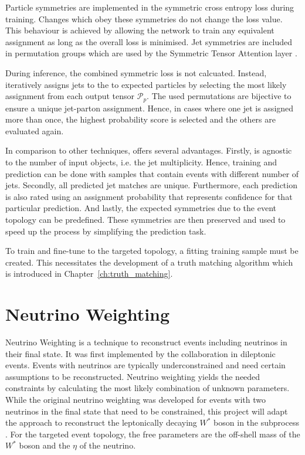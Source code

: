 \documentclass[bachelor,ngerman,english]{GAUBM}
\begin{document}
Particle symmetries are implemented in the symmetric cross entropy loss during training. Changes which obey these symmetries do not change the loss value. This behaviour is achieved by allowing the network to train any equivalent assignment as long as the overall loss is minimised. Jet symmetries are included in permutation groups which are used by the Symmetric Tensor Attention layer \cite{spanet_01}.

During inference, the combined symmetric loss is not calcuated. Instead, \spanet iteratively assigns jets to the to expected particles by selecting the most likely assignment from each output tensor $\mathcal{P}_p$. The used permutations are bijective to ensure a unique jet-parton assignment. Hence, in cases where one jet is assigned more than once, the highest probability score is selected and the others are evaluated again.

In comparison to other techniques, \spanet offers several advantages. Firstly, \spanet is agnostic to the number of input objects, i.e. the jet multiplicity. Hence, training and prediction can be done with samples that contain events with different number of jets. Secondly, all predicted jet matches are unique. Furthermore, each prediction is also rated using an assignment probability that represents \spanets confidence for that particular prediction. And lastly, the expected symmetries due to the event topology can be predefined. These symmetries are then preserved and used to speed up the process by simplifying the prediction task.

To train and fine-tune \spanet to the targeted topology, a fitting training sample must be created. This necessitates the development of a truth matching algorithm which is introduced in Chapter~\ref{ch:truth_matching}.


\chapter{Neutrino Weighting}
\label{ch:neutrino_weighting}
Neutrino Weighting is a technique to reconstruct events including neutrinos in their final state. It was first implemented by the \dzero collaboration \cite{neutrino_weighting:original} in dileptonic \ttbar events. Events with neutrinos are typically underconstrained and need certain assumptions to be reconstructed. Neutrino weighting yields the needed constraints by calculating the most likely combination of unknown parameters. While the original neutrino weighting was developed for events with two neutrinos in the final state that need to be constrained, this project will adapt the approach to reconstruct the leptonically decaying $W^*$ boson in the \HWW subprocess \cite{neutrino_weighting:adaptation}. For the targeted event topology, the free parameters are the off-shell mass of the $W^*$ boson and the $\eta$ of the neutrino.  
\end{document}
